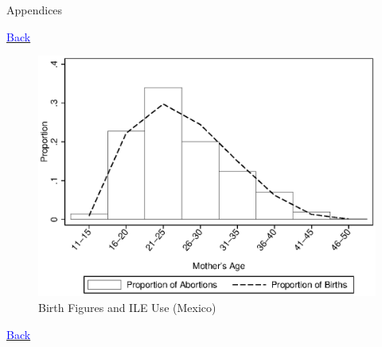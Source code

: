 \documentclass[10pt,letterpaper,subeqn]{beamer}
\begin{document}
\begin{frame}
\begin{center}
\Large Appendices
\end{center}
\end{frame}

\begin{frame}[label=ChileDesc]

\hyperlink{empirA}{\textcolor{blue}{Back}}
\end{frame}

\begin{frame}[label=MexicoDesc]

\end{frame}

\begin{frame}[label=empirA1]
\begin{figure}
\begin{center}
\caption{Birth Figures and ILE Use (Mexico)}
\includegraphics[scale=0.7]{./figures/birthDescriptives.eps}
\end{center}
\end{figure}
\hyperlink{empirB}{\textcolor{blue}{Back}}
\end{frame}
\end{document}
